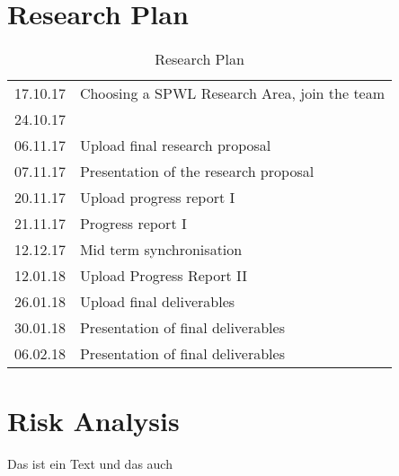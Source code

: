 \documentclass[sigchi-a, authorversion]{acmart}
\begin{document}
\section{Research Plan} %
\begin{table}[H]
  \caption{Research Plan}
  \label{tab:researchPlan}
  \begin{tabular}{ll}
    \toprule
    17.10.17 & Choosing a SPWL Research Area, join the team \\
    24.10.17 & \\
    06.11.17 & Upload final research proposal \\
    07.11.17 & Presentation of the research proposal \\
    20.11.17 & Upload progress report I \\
    21.11.17 & Progress report I \\
    12.12.17 & Mid term synchronisation \\
    12.01.18 & Upload Progress Report II \\
    26.01.18 & Upload final deliverables \\
    30.01.18 & Presentation of final deliverables \\
    06.02.18 & Presentation of final deliverables \\
    \bottomrule
  \end{tabular}
\end{table}

\section{Risk Analysis} %
Das ist ein Text \cite{DBLP:conf/conext/ValanciusLMDR09} und das auch \cite{DBLP:journals/sigmetrics/JalaliAVHAT14}



\end{document}
